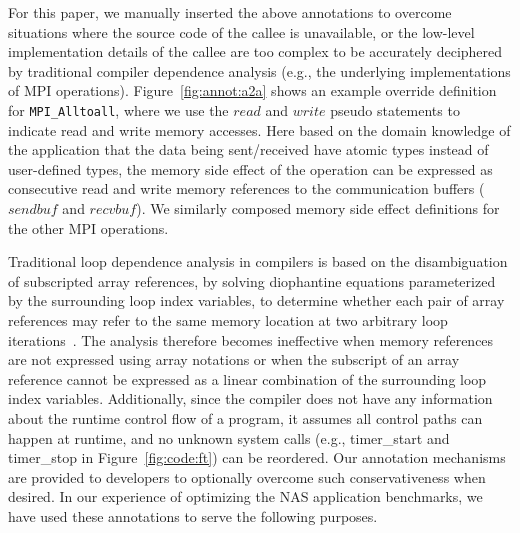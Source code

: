 For this paper, we manually inserted the above annotations to overcome situations where the source code of the callee is unavailable, 
or the low-level
implementation details of the callee are too complex to be accurately
deciphered by traditional compiler dependence analysis (e.g., the underlying implementations of MPI operations). 
Figure~\ref{fig:annot:a2a}
shows an example override definition for \texttt{MPI\_Alltoall}, where we use the $read$ and $write$ pseudo statements to indicate
read and write memory accesses.  Here based on the domain knowledge of the
application that the data being sent/received have atomic types instead of
user-defined types, the memory side effect of the operation can be expressed as consecutive read and write memory references
 to the communication buffers ($sendbuf$ and $recvbuf$). We similarly composed
  memory side effect definitions for the other MPI operations. 

Traditional loop dependence analysis in compilers is based on the disambiguation of subscripted array references, 
by solving diophantine equations parameterized by the surrounding loop index variables, to determine whether each pair of 
array references may refer to the same memory location at two arbitrary loop iterations~\cite{AK:Book01}. The analysis therefore
becomes ineffective when memory references are not expressed using array notations or when the subscript of an array reference cannot be expressed as a linear combination of the surrounding loop index variables. Additionally, since the compiler does not have any information about the runtime control flow of a program, it assumes all control paths can happen at runtime, and no unknown system calls (e.g., timer\_start and timer\_stop in Figure~\ref{fig:code:ft}) can be reordered. Our annotation mechanisms are provided to developers to optionally overcome such conservativeness when desired. In our experience of optimizing the NAS application benchmarks, we have used these annotations to serve the following purposes. 

